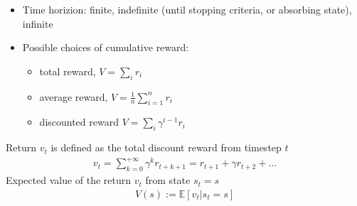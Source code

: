 \documentclass[letterpaper,10pt,english]{jupyterBook}
\begin{document}
\sphinxAtStartPar
{}
\begin{itemize}
\item {} 
\sphinxAtStartPar
Time horizion: finite, indefinite (until stopping criteria, or absorbing state), infinite

\item {} 
\sphinxAtStartPar
Possible choices of cumulative reward:
\begin{itemize}
\item {} 
\sphinxAtStartPar
total reward, \(V = \sum_i r_i\)

\item {} 
\sphinxAtStartPar
average reward, \(V = \frac{1}{n} \sum_{i=1}^{n} r_i\)

\item {} 
\sphinxAtStartPar
discounted reward \(V = \sum_{i} \gamma^{i-1} r_i\)

\end{itemize}

\end{itemize}

\sphinxAtStartPar
Return \(v_t\) is defined as the total discount reward from timestep \(t\)
\begin{equation*}
\begin{split}v_t = \sum_{k=0}^{+\infty} \gamma^k r_{t+k+1} = r_{t+1} + \gamma r_{t+2} + \dots\end{split}
\end{equation*}
\sphinxAtStartPar
{} Expected value of the return \(v_t\) from state \(s_t = s\)
\begin{equation*}
\begin{split}V(s) := \mathbb{E}\left[ v_t | s_t = s  \right]\end{split}
\end{equation*}
\end{document}
